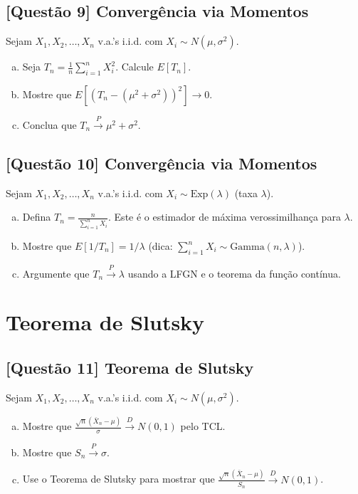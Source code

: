 \documentclass[12pt,a4paper]{article}
\begin{document}
\subsection*{[Questão 9] Convergência via Momentos}

Sejam $X_1, X_2, \ldots, X_n$ v.a.'s i.i.d. com $X_i \sim N(\mu, \sigma^2)$.

\begin{enumerate}[(a)]
    \item Seja $T_n = \frac{1}{n}\sum_{i=1}^n X_i^2$. Calcule $E[T_n]$.
    \item Mostre que $E[(T_n - (\mu^2 + \sigma^2))^2] \to 0$.
    \item Conclua que $T_n \xrightarrow{P} \mu^2 + \sigma^2$.
\end{enumerate}

\subsection*{[Questão 10] Convergência via Momentos}

Sejam $X_1, X_2, \ldots, X_n$ v.a.'s i.i.d. com $X_i \sim \text{Exp}(\lambda)$ (taxa $\lambda$).

\begin{enumerate}[(a)]
    \item Defina $T_n = \frac{n}{\sum_{i=1}^n X_i}$. Este é o estimador de máxima verossimilhança para $\lambda$.
    \item Mostre que $E[1/T_n] = 1/\lambda$ (dica: $\sum_{i=1}^n X_i \sim \text{Gamma}(n, \lambda)$).
    \item Argumente que $T_n \xrightarrow{P} \lambda$ usando a LFGN e o teorema da função contínua.
\end{enumerate}

\section{Teorema de Slutsky}

\subsection*{[Questão 11] Teorema de Slutsky}

Sejam $X_1, X_2, \ldots, X_n$ v.a.'s i.i.d. com $X_i \sim N(\mu, \sigma^2)$.

\begin{enumerate}[(a)]
    \item Mostre que $\frac{\sqrt{n}(\bar{X}_n - \mu)}{\sigma} \xrightarrow{D} N(0,1)$ pelo TCL.
    \item Mostre que $S_n \xrightarrow{P} \sigma$.
    \item Use o Teorema de Slutsky para mostrar que $\frac{\sqrt{n}(\bar{X}_n - \mu)}{S_n} \xrightarrow{D} N(0,1)$.
\end{enumerate}
\end{document}
